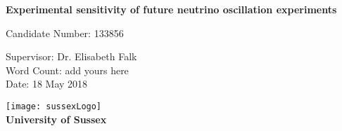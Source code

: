 \begin{titlepage}
\begin{center}

\vspace*{4cm} %
        
	{\Large\textbf{Experimental sensitivity of future neutrino oscillation experiments}}
        
\vspace{1cm} %
      

{\large Candidate Number: 133856

Supervisor: Dr. Elisabeth Falk\\

Word Count: add yours here\\

	Date: 18 May 2018\\
        
}

\vspace{8cm} %

\texttt{[image: sussexLogo]}\\

{\Large\textbf{University of Sussex}}
\end{center}
\end{titlepage}
